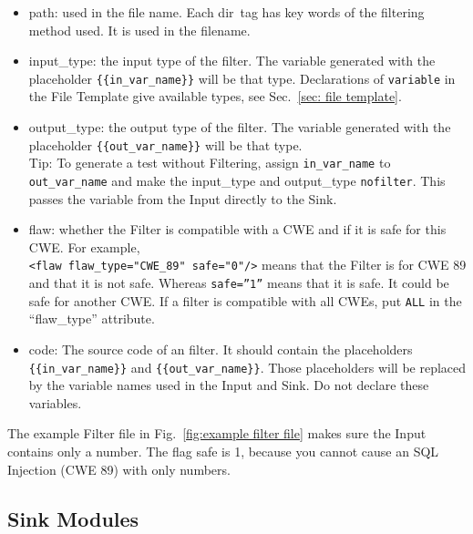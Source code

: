 \documentclass[12pt]{article}
\begin{document}
\begin{itemize}
    \item path: used in the file name.  Each \texlangle dir\texrangle\ 
    tag has
    key words of the filtering method used. It is used in the filename.
    
    \item input\_type: the input type of the filter. The variable 
    generated with
    the placeholder \verb|{{in_var_name}}| will be that type.
    Declarations of \verb|variable| in the File Template give
    available types, see Sec.~\ref{sec: file template}.

    \item output\_type: the output type of the filter.  The variable generated
    with the placeholder \verb|{{out_var_name}}| will be that type. \\
    Tip: To generate a test without Filtering, assign \verb|in_var_name| to
    \verb|out_var_name| and make the input\_type and output\_type \verb|nofilter|.
    This passes the variable from the Input directly to the Sink.

    \item flaw: whether the Filter is compatible with a CWE and if it is 
    safe for this CWE.  For example, \\
    \verb|<flaw flaw_type="CWE_89" safe="0"/>| means that the Filter is for 
    CWE 89 and that it is not safe.  Whereas \verb|safe=”1”| means that it is
    safe.  It could be safe for another CWE.  If a filter is compatible with all
    CWEs, put \verb|ALL| in the ``flaw\_type'' attribute.

    \item code: The source code of an filter. It should contain the placeholders
    \\
    \verb|{{in_var_name}}| and \verb|{{out_var_name}}|.  Those placeholders will 
    be replaced by the variable names used in the Input and Sink.  Do not declare 
    these variables.
\end{itemize}

The example Filter file in Fig.~\ref{fig:example filter file} makes sure
the Input contains only a number.  
The flag safe is 1, because you cannot cause an SQL Injection 
(CWE 89) with only numbers.


\subsection{Sink Modules}
\label{sec:sink modules}
\end{document}
